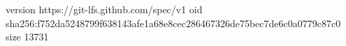 version https://git-lfs.github.com/spec/v1
oid sha256:f752da5248799f638143afe1a68e8cec286467326de75bec7de6c0a0779c87c0
size 13731
